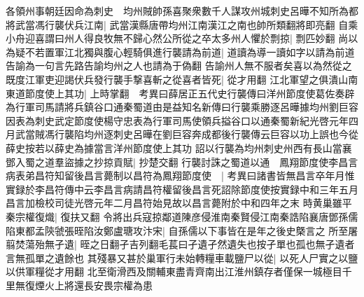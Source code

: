 各領州事朝廷因命為刺史　均州賊帥孫喜聚衆數千人謀攻州城刺史呂曄不知所為都將武當馮行襲伏兵江南|{
	武當漢縣唐帶均州江南漢江之南也帥所類翻將即亮翻}
自乘小舟迎喜謂曰州人得良牧無不歸心然公所從之卒太多州人懼於剽掠|{
	剽匹妙翻}
尚以為疑不若置軍江北獨與腹心輕騎俱進行襲請為前道|{
	道讀為導一讀如字以請為前道告諭為一句言先路告諭均州之人也請為于偽翻}
告諭州人無不服者矣喜以為然從之既度江軍吏迎謁伏兵發行襲手撃喜斬之從喜者皆死|{
	從才用翻}
江北軍望之俱潰山南東道節度使上其功|{
	上時掌翻　考異曰薛居正五代史行襲傳曰洋州節度使葛佐奏辟為行軍司馬請將兵鎮谷口通秦蜀道由是益知名新傳曰行襲乘勝逐呂曄據均州劉巨容因表為刺史武定節度使楊守忠表為行軍司馬使領兵搤谷口以通秦蜀新紀光啓元年四月武當賊馮行襲陷均州逐刺史呂曄在劉巨容奔成都後行襲傳云巨容以功上誤也今從薛史按若以薛史為據當言洋州節度使上其功}
詔以行襲為均州刺史州西有長山當襄鄧入蜀之道羣盜據之抄掠貢賦|{
	抄楚交翻}
行襲討誅之蜀道以通　鳳翔節度使李昌言病表弟昌符知留後昌言薨制以昌符為鳳翔節度使　|{
	考異曰諸書皆無昌言卒年月惟實録於李昌符傳中云李昌言病請昌符權留後昌言死詔除節度使按實録中和三年五月昌言加檢校司徒光啓元年二月昌符始見故以昌言薨附於中和四年之末}
時黄巢雖平秦宗權復熾|{
	復扶又翻}
令將出兵寇掠鄰道陳彦侵淮南秦賢侵江南秦誥陷襄唐鄧孫儒陷東都孟陝虢張晊陷汝鄭盧瑭攻汴宋|{
	自孫儒以下事皆在是年之後史槩言之}
所至屠翦焚蕩殆無孑遺|{
	晊之日翻孑吉列翻毛萇曰孑遺孑然遺失也按孑單也孤也無孑遺者言無孤單之遺餘也}
其殘暴又甚於巢軍行未始轉糧車載鹽尸以從|{
	以死人尸實之以鹽以供軍糧從才用翻}
北至衛滑西及關輔東盡青齊南出江淮州鎮存者僅保一城極目千里無復煙火上將還長安畏宗權為患

